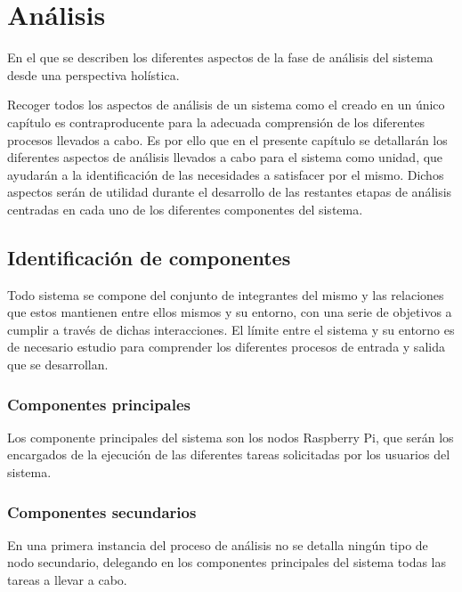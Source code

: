\chapter{Análisis}

\begin{cabstract}
En el que se describen los diferentes aspectos de la fase de análisis del sistema desde una perspectiva holística.
\end{cabstract}

Recoger todos los aspectos de análisis de un sistema como el creado en un único capítulo es contraproducente para la adecuada comprensión de los diferentes procesos llevados a cabo. Es por ello que en el presente capítulo se detallarán los diferentes aspectos de análisis llevados a cabo para el sistema como unidad, que ayudarán a la identificación de las necesidades a satisfacer por el mismo. Dichos aspectos serán de utilidad durante el desarrollo de las restantes etapas de análisis centradas en cada uno de los diferentes componentes del sistema.

\section{Identificación de componentes}

Todo sistema se compone del conjunto de integrantes del mismo y las relaciones que estos mantienen entre ellos mismos y su entorno, con una serie de objetivos a cumplir a través de dichas interacciones. El límite entre el sistema y su entorno es de necesario estudio para comprender los diferentes procesos de  entrada y salida que se desarrollan.

\subsection{Componentes principales} 

Los componente principales del sistema son los nodos Raspberry Pi, que serán los encargados de la ejecución de las diferentes tareas solicitadas por los usuarios del sistema.

\subsection{Componentes secundarios}

En una primera instancia del proceso de análisis no se detalla ningún tipo de nodo secundario, delegando en los componentes principales del sistema todas las tareas a llevar a cabo.

